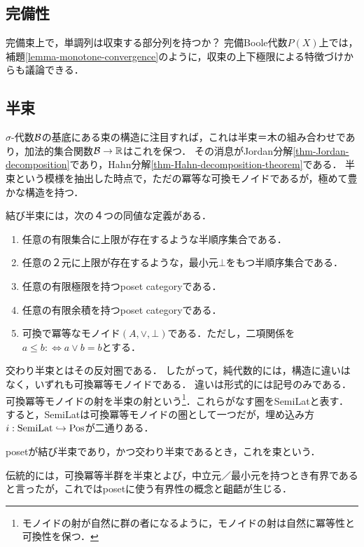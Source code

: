 \documentclass[uplatex, dvipdfmx]{jsreport}
\begin{document}
\subsection{完備性}

\begin{tcolorbox}[colframe=ForestGreen, colback=ForestGreen!10!white,breakable,colbacktitle=ForestGreen!40!white,coltitle=black,fonttitle=\bfseries\sffamily,
title=]
    完備束上で，単調列は収束する部分列を持つか？
    完備Boole代数$P(X)$上では，補題\ref{lemma-monotone-convergence}のように，収束の上下極限による特徴づけからも議論できる．
\end{tcolorbox}

\subsection{半束}

\begin{tcolorbox}[colframe=ForestGreen, colback=ForestGreen!10!white,breakable,colbacktitle=ForestGreen!40!white,coltitle=black,fonttitle=\bfseries\sffamily,
title=]
    $\sigma$-代数$\mathcal{B}$の基底にある束の構造に注目すれば，これは半束＝木の組み合わせであり，加法的集合関数$\mathcal{B}\to\mathbb{R}$はこれを保つ．
    その消息がJordan分解\ref{thm-Jordan-decomposition}であり，Hahn分解\ref{thm-Hahn-decomposition-theorem}である．
    半束という模様を抽出した時点で，ただの冪等な可換モノイドであるが，極めて豊かな構造を持つ．
\end{tcolorbox}

\begin{definition}
    結び半束には，次の４つの同値な定義がある．
    \begin{enumerate}
        \item 任意の有限集合に上限が存在するような半順序集合である．
        \item 任意の２元に上限が存在するような，最小元$\bot$をもつ半順序集合である．
        \item 任意の有限極限を持つposet categoryである．
        \item 任意の有限余積を持つposet categoryである．
        \item 可換で冪等なモノイド$(A,\lor,\bot)$である．ただし，二項関係を$a\le b:\Leftrightarrow a\lor b=b$とする．
    \end{enumerate}
    交わり半束とはその反対圏である．
    したがって，純代数的には，構造に違いはなく，いずれも可換冪等モノイドである．
    違いは形式的には記号のみである．可換冪等モノイドの射を半束の射という\footnote{モノイドの射が自然に群の者になるように，モノイドの射は自然に冪等性と可換性を保つ．}．これらがなす圏をSemiLatと表す．
    すると，SemiLatは可換冪等モノイドの圏として一つだが，埋め込み方$i:\mathrm{SemiLat}\hookrightarrow\mathrm{Pos}$が二通りある．

    posetが結び半束であり，かつ交わり半束であるとき，これを束という．
\end{definition}
\begin{remark}
    伝統的には，可換冪等半群を半束とよび，中立元／最小元を持つとき有界であると言ったが，これではposetに使う有界性の概念と齟齬が生じる．
\end{remark}
\end{document}
